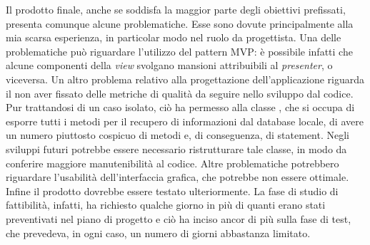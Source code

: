 \documentclass[../Tesi.tex]{subfiles}
\begin{document}
	Il prodotto finale, anche se soddisfa la maggior parte degli obiettivi prefissati, presenta comunque alcune problematiche. Esse sono dovute principalmente alla mia scarsa esperienza, in particolar modo nel ruolo da progettista. Una delle problematiche può riguardare l'utilizzo del pattern MVP: è possibile infatti che alcune componenti della \textit{view} svolgano mansioni attribuibili al \textit{presenter}, o viceversa. Un altro problema relativo alla progettazione dell'applicazione riguarda il non aver fissato delle metriche di qualità da seguire nello sviluppo dal codice. Pur trattandosi di un caso isolato, ciò ha permesso alla classe , che si occupa di esporre tutti i metodi per il recupero di informazioni dal database locale, di avere un numero piuttosto cospicuo di metodi e, di conseguenza, di statement. Negli sviluppi futuri potrebbe essere necessario ristrutturare tale classe, in modo da conferire maggiore manutenibilità al codice. Altre problematiche potrebbero riguardare l'usabilità dell'interfaccia grafica, che potrebbe non essere ottimale. Infine il prodotto dovrebbe essere testato ulteriormente. La fase di studio di fattibilità, infatti, ha richiesto qualche giorno in più di quanti erano stati preventivati nel piano di progetto e ciò ha inciso ancor di più sulla fase di test, che prevedeva, in ogni caso, un numero di giorni abbastanza limitato.
\end{document}
